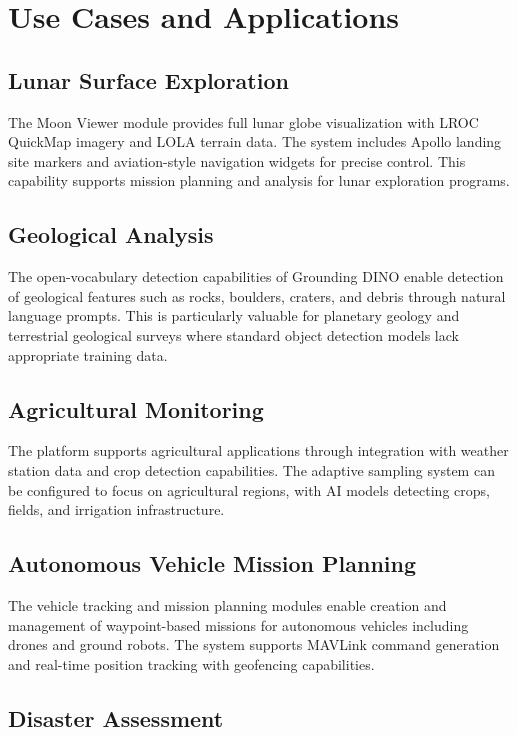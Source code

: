 \documentclass[conference]{IEEEtran}
\begin{document}
\section{Use Cases and Applications}

\subsection{Lunar Surface Exploration}

The Moon Viewer module provides full lunar globe visualization with LROC QuickMap imagery and LOLA terrain data. The system includes Apollo landing site markers and aviation-style navigation widgets for precise control. This capability supports mission planning and analysis for lunar exploration programs.

\subsection{Geological Analysis}

The open-vocabulary detection capabilities of Grounding DINO enable detection of geological features such as rocks, boulders, craters, and debris through natural language prompts. This is particularly valuable for planetary geology and terrestrial geological surveys where standard object detection models lack appropriate training data.

\subsection{Agricultural Monitoring}

The platform supports agricultural applications through integration with weather station data and crop detection capabilities. The adaptive sampling system can be configured to focus on agricultural regions, with AI models detecting crops, fields, and irrigation infrastructure.

\subsection{Autonomous Vehicle Mission Planning}

The vehicle tracking and mission planning modules enable creation and management of waypoint-based missions for autonomous vehicles including drones and ground robots. The system supports MAVLink command generation and real-time position tracking with geofencing capabilities.

\subsection{Disaster Assessment}
\end{document}
